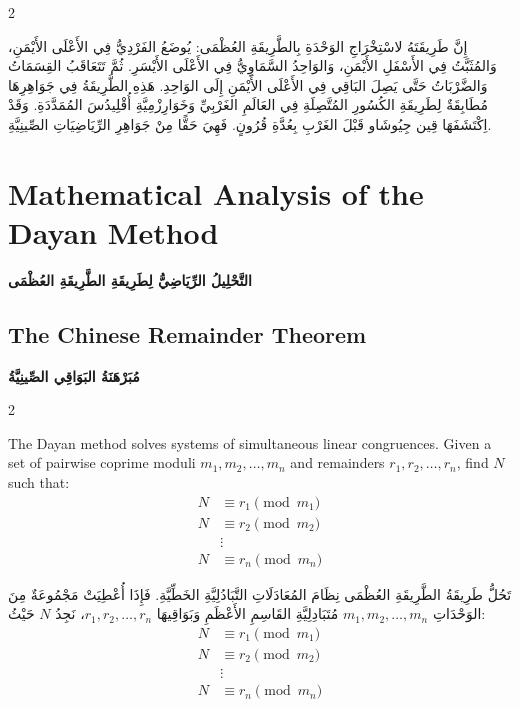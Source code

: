 \documentclass[11pt,a4paper]{article}
\newcommand{\ar}[1]{\arabicfont\beginR #1\endR}
\newenvironment{bilingual}{%
  \begin{paracol}{2}
}{%
  \end{paracol}
}
\begin{document}
\begin{bilingual}
\begin{rightcolumn*}
\ar{إِنَّ طَرِيقَتَهُ لاسْتِخْرَاجِ الوَحْدَةِ بِالطَّرِيقَةِ العُظْمَى: يُوضَعُ الفَرْدِيُّ فِي الأَعْلَى الأَيْمَنِ، وَالمُثَبَّتُ فِي الأَسْفَلِ الأَيْمَنِ، وَالوَاحِدُ السَّمَاوِيُّ فِي الأَعْلَى الأَيْسَرِ. ثُمَّ تَتَعَاقَبُ القِسَمَاتُ وَالضَّرْبَاتُ حَتَّى يَصِلَ البَاقِي فِي الأَعْلَى الأَيْمَنِ إِلَى الوَاحِدِ. هَذِهِ الطَّرِيقَةُ فِي جَوَاهِرِهَا مُطَابِقَةٌ لِطَرِيقَةِ الكُسُورِ المُتَّصِلَةِ فِي العَالَمِ الغَرْبِيِّ وَخَوَارِزْمِيَّةِ أُقْلِيدُسَ المُمَدَّدَةِ. وَقَدْ اِكْتَشَفَهَا قِين جِيُوشَاو قَبْلَ الغَرْبِ بِعُدَّةِ قُرُونٍ. فَهِيَ حَقًّا مِنْ جَوَاهِرِ الرِّيَاضِيَاتِ الصِّينِيَّةِ.}
\end{rightcolumn*}

\end{bilingual}

\newpage

\section{Mathematical Analysis of the Dayan Method}
\ar{\textbf{التَّحْلِيلُ الرِّيَاضِيُّ لِطَرِيقَةِ الطَّرِيقَةِ العُظْمَى}}

\subsection{The Chinese Remainder Theorem}
\ar{\textbf{مُبَرْهَنَةُ البَوَاقِي الصِّينِيَّةُ}}

\begin{bilingual}

\begin{leftcolumn*}
The Dayan method solves systems of simultaneous linear congruences. Given a set of pairwise coprime moduli $m_1, m_2, \ldots, m_n$ and remainders $r_1, r_2, \ldots, r_n$, find $N$ such that:
\begin{align*}
N &\equiv r_1 \pmod{m_1} \\
N &\equiv r_2 \pmod{m_2} \\
  &\vdots \\
N &\equiv r_n \pmod{m_n}
\end{align*}
\end{leftcolumn*}

\begin{rightcolumn*}
\ar{تَحُلُّ طَرِيقَةُ الطَّرِيقَةِ العُظْمَى نِظَامَ المُعَادَلَاتِ التَّبَادُلِيَّةِ الخَطِّيَّةِ. فَإِذَا أُعْطِيَتْ مَجْمُوعَةٌ مِنَ الوَحْدَاتِ $m_1, m_2, \ldots, m_n$ مُتَبَادِلِيَّةِ القَاسِمِ الأَعْظَمِ وَبَوَاقِيهَا $r_1, r_2, \ldots, r_n$، نَجِدُ $N$ حَيْثُ:}
\begin{align*}
N &\equiv r_1 \pmod{m_1} \\
N &\equiv r_2 \pmod{m_2} \\
  &\vdots \\
N &\equiv r_n \pmod{m_n}
\end{align*}
\end{rightcolumn*}

\end{bilingual}
\end{document}
